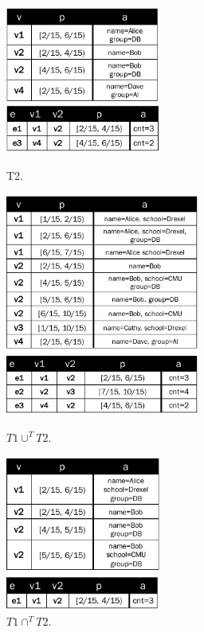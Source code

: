 \begin{figure}[t]
\begin{minipage}[b]{0.3\textwidth} %
\includegraphics[width=2.0in]{figs/T2_rel.pdf}
\caption{T2.}
\vspace{-0.5cm}
\label{fig:tg_t2}
\end{minipage}
\begin{minipage}[b]{0.3\textwidth} %
\includegraphics[width=2.5in]{figs/T1_union_T2_rel.pdf}
\vspace{-0.5cm}
\caption{$T1 \cup^T T2.$}
\label{fig:tg_union}
\vspace{-0.5cm}
\end{minipage}\hfill
\begin{minipage}[b]{0.3\textwidth} %
\includegraphics[width=2.0in]{figs/T1_inter_T2_rel.pdf}
\caption{$T1 \cap^T T2.$}
\label{fig:tg_inter}
\vspace{-0.5cm}
\end{minipage}
\end{figure}

